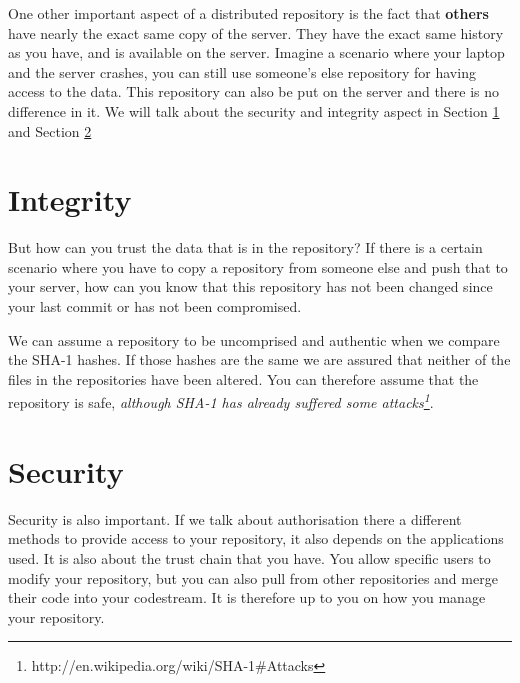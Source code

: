 One other important aspect of a distributed repository is the fact that \textbf{others} have nearly the exact same copy of the server. They have the exact same history as you have, and is available on the server. Imagine a scenario where your laptop and the server crashes, you can still use someone's else repository for having access to the data. This repository can also be put on the server and there is no difference in it. We will talk about the security and integrity aspect in Section \ref{sec:integrity} and Section \ref{sec:security}

\section{Integrity}
\label{sec:integrity}
But how can you trust the data that is in the repository? If there is a certain scenario where you have to copy a repository from someone else and push that to your server, how can you know that this repository has not been changed since your last commit or has not been compromised.

We can assume a repository to be uncomprised and authentic when we compare the SHA-1 hashes. If those hashes are the same we are assured that neither of the files in the repositories have been altered. You can therefore assume that the repository is safe, \textit{although SHA-1 has already suffered some attacks\footnote{http://en.wikipedia.org/wiki/SHA-1\#Attacks}}.

\section{Security}
\label{sec:security}
Security is also important. If we talk about authorisation there a different methods to provide access to your repository, it also depends on the applications used. It is also about the trust chain that you have. You allow specific users to modify your repository, but you can also pull from other repositories and merge their code into your codestream. It is therefore up to you on how you manage your repository.
